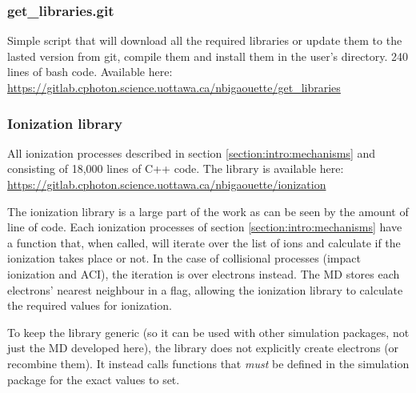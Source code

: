 \subsubsection{get\_libraries.git} \label{section:tools:libraries:getlibraries}

Simple script that will download all the required libraries or
update them to the lasted version from git, compile them and install them in the
user's directory. 240 lines of bash code.
Available here:\\
\url{https://gitlab.cphoton.science.uottawa.ca/nbigaouette/get_libraries}



\subsubsection{Ionization library}
\label{section:tools:libraries:ionization}

All ionization processes described in section
\ref{section:intro:mechanisms} and consisting of 18,000 lines of C++ code.
The library is available here:\\
\url{https://gitlab.cphoton.science.uottawa.ca/nbigaouette/ionization}

The ionization library is a large part of the work as can be seen by the amount
of line of code. Each ionization processes of section
\ref{section:intro:mechanisms} have a function that, when called, will iterate
over the list of ions and calculate if the ionization takes place or not. In the
case of collisional processes (impact ionization and ACI), the iteration is over
electrons instead. The MD stores each electrons' nearest neighbour in a flag,
allowing the ionization library to calculate the required values for ionization.

To keep the library generic (so it can be used with other simulation packages,
not just the MD developed here), the library does not explicitly create
electrons (or recombine them). It instead calls functions that \textit{must}
be defined in the simulation package for the exact values to set.


